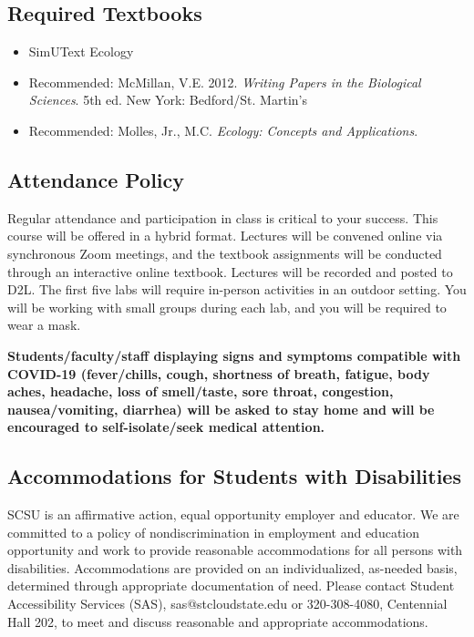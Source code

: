 \documentclass{tufte-handout}
\begin{document}
\begin{fullwidth}
\subsection{Required Textbooks}

\begin{itemize}
	\item SimUText Ecology
	\item Recommended: McMillan, V.E. 2012. \emph{Writing Papers in the Biological Sciences}. 5th ed. New York: Bedford/St. Martin's
	\item Recommended: Molles, Jr., M.C. \emph{Ecology: Concepts and Applications}.
\end{itemize}

\subsection{Attendance Policy}

Regular attendance and participation in class is critical to your success. This course will be offered in a hybrid format. Lectures will be convened online via synchronous Zoom meetings, and the textbook assignments will be conducted through an interactive online textbook. Lectures will be recorded and posted to D2L. The first five labs will require in-person activities in an outdoor setting. You will be working with small groups during each lab, and you will be required to wear a mask. 

\textbf{Students/faculty/staff displaying signs and symptoms compatible with COVID-19 (fever/chills, cough, shortness of breath, fatigue, body aches, headache, loss of smell/taste, sore throat, congestion,  nausea/vomiting, diarrhea) will be asked to stay home and will be encouraged to self-isolate/seek medical attention.}



\subsection{Accommodations for Students with Disabilities}

SCSU is an affirmative action, equal opportunity employer and educator. We are committed to a policy of nondiscrimination in employment and education opportunity and work to provide reasonable accommodations for all persons with disabilities. Accommodations are provided on an individualized, as-needed basis, determined through appropriate documentation of need. Please contact Student Accessibility Services (SAS), sas@stcloudstate.edu or 320-308-4080, Centennial Hall 202, to meet and discuss reasonable and appropriate accommodations. 


\end{fullwidth}
\end{document}

